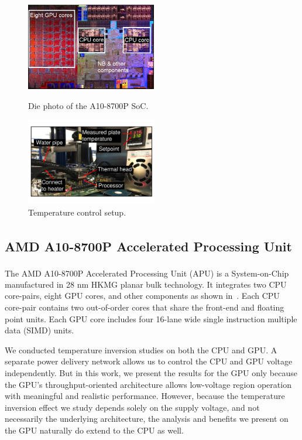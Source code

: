 \begin{figure}[t!]
  \centering
  \begin{minipage}{0.45\linewidth}
    \centering
                \includegraphics[trim=0 0 0 0,clip,height=1.5in]{graphs/temperature/carrizo-die.jpg}
                \caption{Die photo of the A10-8700P SoC.}
                \label{fig:die-shot}
  \end{minipage}
\hfill
  \begin{minipage}{0.45\linewidth}
    \centering
                \includegraphics[trim=0 55 0 55,clip,height=1.5in]{graphs/temperature/temperature-control.pdf}
                \caption{Temperature control setup.}
                \label{fig:temp-control-photo}
  \end{minipage}

\end{figure}

\subsection{AMD\textsuperscript{\textregistered} A10-8700P Accelerated Processing Unit}
\label{sec:temperature:setup:apu}

The AMD\textsuperscript{\textregistered} A10-8700P Accelerated Processing Unit (APU) is a System-on-Chip manufactured in 28 nm HKMG planar bulk technology. It integrates two CPU core-pairs, eight GPU cores, and other components as shown in~. Each CPU core-pair contains two out-of-order cores that share the front-end and floating point units. Each GPU core includes four 16-lane wide single instruction multiple data (SIMD) units. 

We conducted temperature inversion studies on both the CPU and GPU. A separate power delivery network allows us to control the CPU and GPU voltage independently. But in this work, we present the results for the GPU only because the GPU's throughput-oriented architecture allows low-voltage region operation with meaningful and realistic performance. However, because the temperature inversion effect we study depends solely on the supply voltage, and not necessarily the underlying architecture, the analysis and benefits we present on the GPU naturally do extend to the CPU as well.

